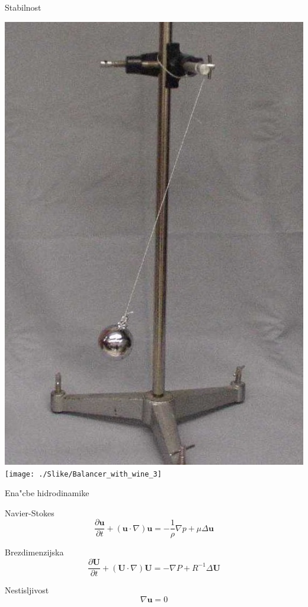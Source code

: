 \documentclass{beamer}
\renewcommand{\vec}{\mathbf}
\begin{document}
\begin{frame}{Stabilnost}
\begin{center}
\includegraphics[height=0.8\textheight]{./Slike/SimplePendulum3} \quad
\texttt{[image: ./Slike/Balancer\_with\_wine\_3]}
\end{center}
\end{frame}

\begin{frame}{Ena"cbe hidrodinamike}

\begin{block}{Navier-Stokes}
\[ \frac{\partial \vec u}{\partial t} + (\vec u \cdot \nabla) \vec u = -\frac{1}{\rho}\nabla p + \mu \Delta \vec u \] 
\end{block}
\begin{block}{Brezdimenzijska}
\[ \frac{\partial \vec U}{\partial t} + (\vec U \cdot \nabla) \vec U = -\nabla P + R^{-1}\Delta \vec U \] 
\end{block}
\begin{block}{Nestisljivost}
\[ \nabla \vec u = 0 \]
\end{block}

\end{frame}
\end{document}
